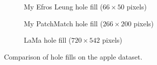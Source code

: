 \begin{figure}
\centering
\hfill
\begin{subfigure}{0.33\linewidth}
\caption{My Efros Leung hole fill ($66\times50$ pixels)}
\label{fig:efapple}
\end{subfigure}
\hfill
\begin{subfigure}{0.33\linewidth}
\caption{My PatchMatch hole fill ($266\times200$ pixels)}
\label{fig:pmapple}
\end{subfigure}
\begin{subfigure}{0.33\linewidth}
\caption{LaMa hole fill ($720\times542$ pixels)}
\label{fig:lamaapple}
\end{subfigure}
\caption{Comparison of hole fills on the apple dataset.}
\label{fig:applefillcompare}
\end{figure}

